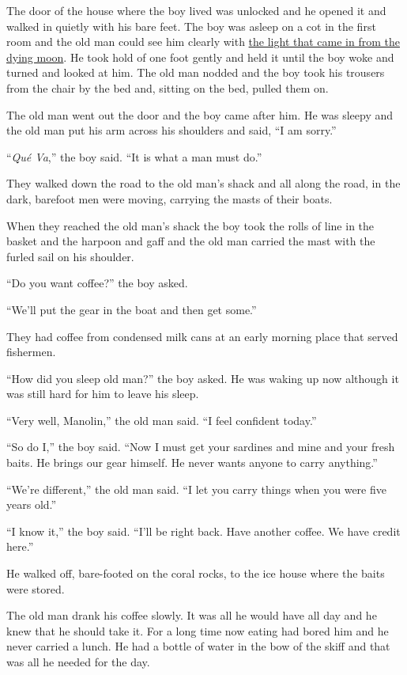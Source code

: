 The door of the house where the boy lived was unlocked and he opened it and
walked in quietly with his \gls{bare} \gls{feet}. The boy was asleep on a
\gls{cot} in the first room and the old man could see him clearly with
\uline{the light that came in from the dying moon}. He took hold of one foot
\gls{gently} and held it until the boy woke and turned and looked at him.
The old man \gls{nodded} and the boy took his trousers from the chair by the
bed and, sitting on the bed, pulled them on.

The old man went out the door and the boy came after him. He was sleepy and
the old man put his arm across his shoulders and said, ``I am \gls{sorry}.''

``\emph{Qué Va},'' the boy said. ``It is what a man must do.''

They walked down the road to the old man's shack and all along the road, in
the dark, barefoot men were moving, carrying the masts of their boats.

When they \gls{reached} the old man's shack the boy took the rolls of line
in the basket and the harpoon and gaff and the old man carried the mast with
the furled sail on his shoulder.

``Do you want coffee?'' the boy asked.

``We'll put the gear in the boat and then get some.''

They had coffee from \gls{condensed} milk cans at an early morning place that served fishermen.

``How did you sleep old man?'' the boy asked. He was waking up now \gls{although}
it was still hard for him to leave his sleep.

``Very well, Manolin,'' the old man said. ``I feel confident today.''

``So do I,'' the boy said. ``Now I must get your sardines and mine and your
fresh baits. He brings our gear himself. He never wants anyone to carry
anything.''

``We're different,'' the old man said. ``I let you carry things when you were five years old.''

``I know it,'' the boy said. ``I'll be right back. Have another coffee. We have \gls{credit} here.''

He walked off, bare-footed on the \gls{coral} rocks, to the ice house where
the baits were stored.

The old man drank his coffee slowly. It was all he would have all day and he
knew that he should take it. For a long time now eating had bored him and he
never carried a lunch. He had a bottle of water in the bow of the
skiff and that was all he needed for the day.

